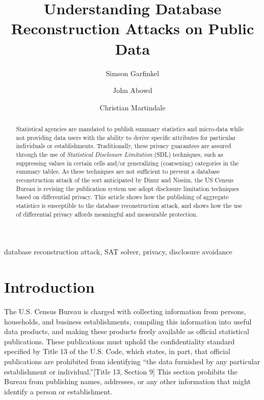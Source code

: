 \documentclass[runningheads]{llncs}
\newif\ifshortversion
\begin{document}
\title{Understanding Database Reconstruction Attacks on Public Data}
\author{Simson Garfinkel \and John Abowd \and Christian Martindale }

\maketitle
\begin{abstract}
Statistical agencies are mandated to publish summary statistics and
micro-data while not providing data users with the ability to derive
specific attributes for particular individuals or
establishments. 
Traditionally, these privacy guarantees are assured through the
use of \emph{Statistical Disclosure Limitation} (SDL)
techniques, such as suppressing values in certain cells 
and/or generalizing (coarsening) categories in
the summary tables.  As these techniques are not sufficient to
prevent a database reconstruction attack of the sort anticipated by
Dinur and Nissim\cite{noise}, the US Census Bureau is revising the
publication system use adopt disclosure limitation techniques based on differential privacy. 
This article shows how the publishing of aggregate statistics is
susceptible to the database reconstruction attack, and shows how the
use of differential privacy affords meaningful and measurable protection.
\end{abstract}

\begin{keywords}
database reconstruction attack, SAT solver, 
\ifshortversion\else privacy,\fi 
disclosure avoidance
\end{keywords}

\section{Introduction}
The U.S. Census Bureau is
charged with collecting information from persons, households, and
business establishments, compiling this information into useful
data products, and making these products freely available as official
statistical publications. These publications must uphold the
confidentiality standard specified by Title 13 of the U.S. Code, which
states, in part, that official publications are prohibited from
identifying ``the data furnished by any particular
establishment or individual.''[Title 13, Section 9] This section
prohibits the Bureau from publishing names, addresses, or any other
information that might identify a person or establishment.
\end{document}
